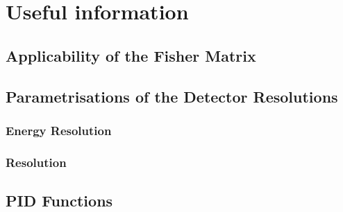 \chapter{Useful information}
\label{sec:app}

\section{Applicability of the Fisher Matrix}
\label{app:fisher_valid}


\section{Parametrisations of the Detector Resolutions}
\label{app:reco_params}

\subsection{Energy Resolution}

\subsection{\coszen Resolution}


\section{PID Functions}
\label{app:pid}

